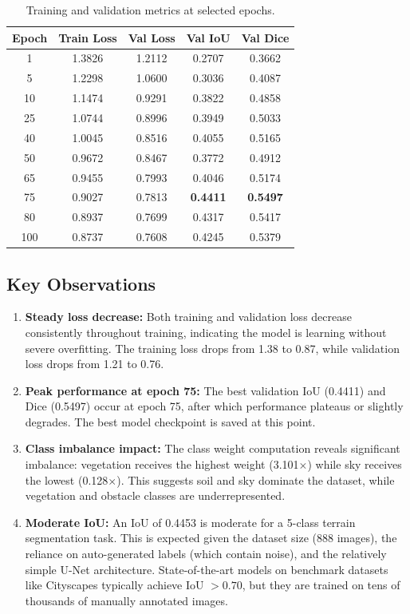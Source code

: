 \documentclass[12pt,a4paper]{article}
\begin{document}
\begin{table}[H]
\centering
\caption{Training and validation metrics at selected epochs.}
\label{tab:results}
\begin{tabular}{@{}ccccc@{}}
\toprule
\textbf{Epoch} & \textbf{Train Loss} & \textbf{Val Loss} & \textbf{Val IoU} & \textbf{Val Dice} \\
\midrule
1   & 1.3826 & 1.2112 & 0.2707 & 0.3662 \\
5   & 1.2298 & 1.0600 & 0.3036 & 0.4087 \\
10  & 1.1474 & 0.9291 & 0.3822 & 0.4858 \\
25  & 1.0744 & 0.8996 & 0.3949 & 0.5033 \\
40  & 1.0045 & 0.8516 & 0.4055 & 0.5165 \\
50  & 0.9672 & 0.8467 & 0.3772 & 0.4912 \\
65  & 0.9455 & 0.7993 & 0.4046 & 0.5174 \\
75  & 0.9027 & 0.7813 & \textbf{0.4411} & \textbf{0.5497} \\
80  & 0.8937 & 0.7699 & 0.4317 & 0.5417 \\
100 & 0.8737 & 0.7608 & 0.4245 & 0.5379 \\
\bottomrule
\end{tabular}
\end{table}

\subsection{Key Observations}

\begin{enumerate}[noitemsep]
    \item \textbf{Steady loss decrease:} Both training and validation loss decrease consistently throughout training, indicating the model is learning without severe overfitting. The training loss drops from 1.38 to 0.87, while validation loss drops from 1.21 to 0.76.

    \item \textbf{Peak performance at epoch 75:} The best validation IoU (0.4411) and Dice (0.5497) occur at epoch 75, after which performance plateaus or slightly degrades. The best model checkpoint is saved at this point.

    \item \textbf{Class imbalance impact:} The class weight computation reveals significant imbalance: vegetation receives the highest weight (3.101$\times$) while sky receives the lowest (0.128$\times$). This suggests soil and sky dominate the dataset, while vegetation and obstacle classes are underrepresented.

    \item \textbf{Moderate IoU:} An IoU of 0.4453 is moderate for a 5-class terrain segmentation task. This is expected given the dataset size (888 images), the reliance on auto-generated labels (which contain noise), and the relatively simple U-Net architecture. State-of-the-art models on benchmark datasets like Cityscapes typically achieve IoU $> 0.70$, but they are trained on tens of thousands of manually annotated images.
\end{enumerate}
\end{document}
